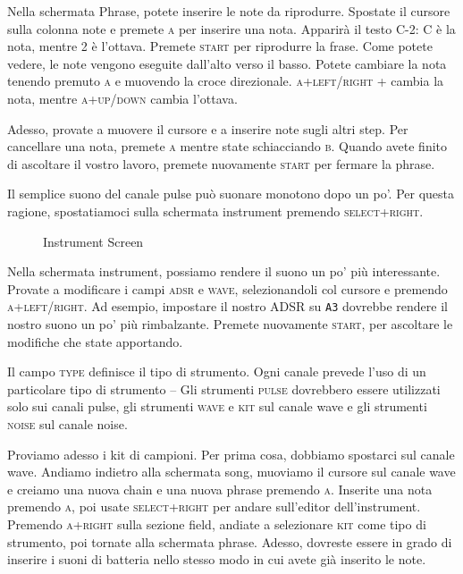 Nella schermata Phrase, potete inserire le note da riprodurre. Spostate il cursore sulla colonna note e premete \textsc{a} per inserire una nota. Apparirà il testo C-2: C è la nota, mentre 2 è l’ottava. Premete \textsc{start} per riprodurre la frase. Come potete vedere, le note vengono eseguite dall'alto verso il basso. Potete cambiare la nota tenendo premuto \textsc{a} e muovendo la croce direzionale. \textsc{a+left/right} + cambia la nota, mentre \textsc{a+up/down} cambia l’ottava.

Adesso, provate a muovere il cursore e a inserire note sugli altri step. Per cancellare una nota, premete \textsc{a} mentre state schiacciando \textsc{b}. Quando avete finito di ascoltare il vostro lavoro, premete nuovamente \textsc{start} per fermare la phrase. 

Il semplice suono del canale pulse può suonare monotono dopo un po'. Per questa ragione, spostatiamoci sulla schermata instrument premendo \textsc{select+right}.

\begin{figure}[hbtp]
\centering
{}
\caption{Instrument Screen}
\label{fig:instr}
\end{figure}

Nella schermata instrument, possiamo rendere il suono un po' più interessante. Provate a modificare i campi \textsc{adsr} e \textsc{wave}, selezionandoli col cursore e premendo \textsc{a+left/right}. Ad esempio, impostare il nostro ADSR su \texttt{A3} dovrebbe  rendere il nostro suono un po' più rimbalzante. Premete nuovamente \textsc{start}, per ascoltare le modifiche che state apportando.

Il campo \textsc{type} definisce il tipo di strumento. Ogni canale prevede l'uso di un particolare tipo di strumento -- Gli strumenti \textsc{pulse} dovrebbero essere utilizzati solo sui canali pulse, gli strumenti \textsc{wave} e \textsc{kit} sul canale wave e gli strumenti \textsc{noise} sul canale noise.

Proviamo adesso i kit di campioni. Per prima cosa, dobbiamo spostarci sul canale wave. Andiamo indietro alla schermata song, muoviamo il cursore sul canale wave e creiamo una nuova chain e una nuova phrase premendo \textsc{a}. Inserite una nota premendo \textsc{a}, poi usate \textsc{select+right} per andare sull'editor dell'instrument. Premendo \textsc{a+right} sulla sezione field, andiate a selezionare \textsc{kit} come tipo di strumento, poi tornate alla schermata phrase. Adesso, dovreste essere in grado di inserire i suoni di batteria nello stesso modo in cui avete già inserito le note.

